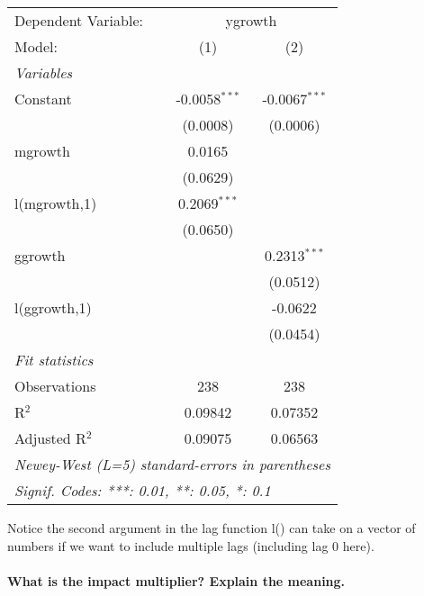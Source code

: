 \documentclass[
]{article}
\begin{document}
\begingroup
\centering
\begin{tabular}{lcc}
   \tabularnewline \midrule \midrule
   Dependent Variable: & \multicolumn{2}{c}{ygrowth}\\
   Model:         & (1)             & (2)\\  
   \midrule
   \emph{Variables}\\
   Constant       & -0.0058$^{***}$ & -0.0067$^{***}$\\   
                  & (0.0008)        & (0.0006)\\   
   mgrowth        & 0.0165          &   \\   
                  & (0.0629)        &   \\   
   l(mgrowth,1)   & 0.2069$^{***}$  &   \\   
                  & (0.0650)        &   \\   
   ggrowth        &                 & 0.2313$^{***}$\\   
                  &                 & (0.0512)\\   
   l(ggrowth,1)   &                 & -0.0622\\   
                  &                 & (0.0454)\\   
   \midrule
   \emph{Fit statistics}\\
   Observations   & 238             & 238\\  
   R$^2$          & 0.09842         & 0.07352\\  
   Adjusted R$^2$ & 0.09075         & 0.06563\\  
   \midrule \midrule
   \multicolumn{3}{l}{\emph{Newey-West (L=5) standard-errors in parentheses}}\\
   \multicolumn{3}{l}{\emph{Signif. Codes: ***: 0.01, **: 0.05, *: 0.1}}\\
\end{tabular}
\par\endgroup

Notice the second argument in the lag function l() can take on a vector
of numbers if we want to include multiple lags (including lag 0 here).

\hypertarget{what-is-the-impact-multiplier-explain-the-meaning.}{%
\paragraph{What is the impact multiplier? Explain the
meaning.}\label{what-is-the-impact-multiplier-explain-the-meaning.}}
\end{document}

